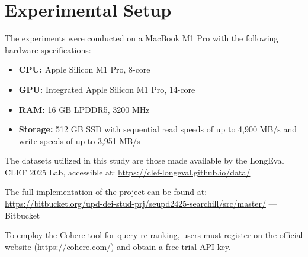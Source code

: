 \section{Experimental Setup}
\label{sec:setup}

The experiments were conducted on a MacBook M1 Pro with the following hardware specifications:
\begin{itemize}
    \item \textbf{CPU:} Apple Silicon M1 Pro, 8-core
    \item \textbf{GPU:} Integrated Apple Silicon M1 Pro, 14-core
    \item \textbf{RAM:} 16 GB LPDDR5, 3200 MHz
    \item \textbf{Storage:} 512 GB SSD with sequential read speeds of up to 4,900 MB/s and write speeds of up to 3,951 MB/s
\end{itemize}

The datasets utilized in this study are those made available by the LongEval CLEF 2025 Lab, accessible at: \href{https://clef-longeval.github.io/data/}{https://clef-longeval.github.io/data/}

The full implementation of the project can be found at: \href{https://bitbucket.org/upd-dei-stud-prj/seupd2425-searchill/src/master/}{https://bitbucket.org/upd-dei-stud-prj/seupd2425-searchill/src/master/} --- Bitbucket 

To employ the Cohere tool for query re-ranking, users must register on the official website (\url{https://cohere.com/}) and obtain a free trial API key.
